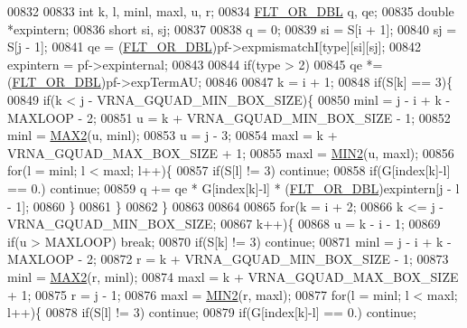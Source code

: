 \begin{DoxyCode}
00832 
00833   \textcolor{keywordtype}{int}         k, l, minl, maxl, u, r;
00834   \hyperlink{group__data__structures_ga31125aeace516926bf7f251f759b6126}{FLT\_OR\_DBL}  q, qe;
00835   \textcolor{keywordtype}{double}      *expintern;
00836   \textcolor{keywordtype}{short}       si, sj;
00837 
00838   q         = 0;
00839   si        = S[i + 1];
00840   sj        = S[j - 1];
00841   qe        = (\hyperlink{group__data__structures_ga31125aeace516926bf7f251f759b6126}{FLT\_OR\_DBL})pf->expmismatchI[type][si][sj];
00842   expintern = pf->expinternal;
00843 
00844   \textcolor{keywordflow}{if}(type > 2)
00845     qe *= (\hyperlink{group__data__structures_ga31125aeace516926bf7f251f759b6126}{FLT\_OR\_DBL})pf->expTermAU;
00846 
00847   k = i + 1;
00848   \textcolor{keywordflow}{if}(S[k] == 3)\{
00849     \textcolor{keywordflow}{if}(k < j - VRNA\_GQUAD\_MIN\_BOX\_SIZE)\{
00850       minl  = j - i + k - MAXLOOP - 2;
00851       u     = k + VRNA\_GQUAD\_MIN\_BOX\_SIZE - 1;
00852       minl  = \hyperlink{group__utils_gadd91367918fadbc8d585940d6206d6d2}{MAX2}(u, minl);
00853       u     = j - 3;
00854       maxl  = k + VRNA\_GQUAD\_MAX\_BOX\_SIZE + 1;
00855       maxl  = \hyperlink{group__utils_ga2dd4a927a7f937f43a90c144d79107d8}{MIN2}(u, maxl);
00856       \textcolor{keywordflow}{for}(l = minl; l < maxl; l++)\{
00857         \textcolor{keywordflow}{if}(S[l] != 3) \textcolor{keywordflow}{continue};
00858         \textcolor{keywordflow}{if}(G[index[k]-l] == 0.) \textcolor{keywordflow}{continue};
00859         q += qe * G[index[k]-l] * (\hyperlink{group__data__structures_ga31125aeace516926bf7f251f759b6126}{FLT\_OR\_DBL})expintern[j - l - 1];
00860       \}
00861     \}
00862   \}
00863 
00864 
00865   \textcolor{keywordflow}{for}(k = i + 2;
00866       k <= j - VRNA\_GQUAD\_MIN\_BOX\_SIZE;
00867       k++)\{
00868     u = k - i - 1;
00869     \textcolor{keywordflow}{if}(u > MAXLOOP) \textcolor{keywordflow}{break};
00870     \textcolor{keywordflow}{if}(S[k] != 3) \textcolor{keywordflow}{continue};
00871     minl  = j - i + k - MAXLOOP - 2;
00872     r     = k + VRNA\_GQUAD\_MIN\_BOX\_SIZE - 1;
00873     minl  = \hyperlink{group__utils_gadd91367918fadbc8d585940d6206d6d2}{MAX2}(r, minl);
00874     maxl  = k + VRNA\_GQUAD\_MAX\_BOX\_SIZE + 1;
00875     r     = j - 1;
00876     maxl  = \hyperlink{group__utils_ga2dd4a927a7f937f43a90c144d79107d8}{MIN2}(r, maxl);
00877     \textcolor{keywordflow}{for}(l = minl; l < maxl; l++)\{
00878       \textcolor{keywordflow}{if}(S[l] != 3) \textcolor{keywordflow}{continue};
00879       \textcolor{keywordflow}{if}(G[index[k]-l] == 0.) \textcolor{keywordflow}{continue};

\end{DoxyCode}

